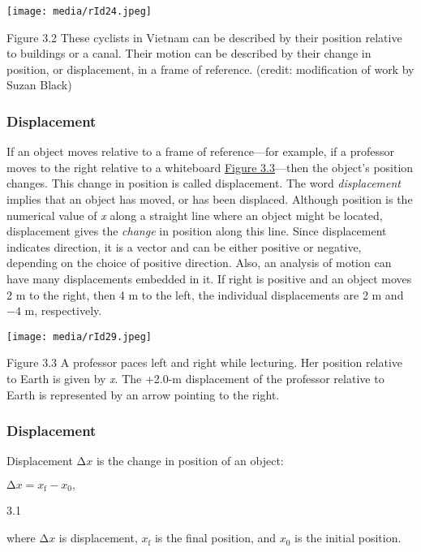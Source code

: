 \texttt{[image: media/rId24.jpeg]}

Figure 3.2 These cyclists in Vietnam can be described by their position
relative to buildings or a canal. Their motion can be described by their
change in position, or displacement, in a frame of reference. (credit:
modification of work by Suzan Black)

\hypertarget{displacement}{%
\subsubsection{Displacement}\label{displacement}}

If an object moves relative to a frame of reference---for example, if a
professor moves to the right relative to a whiteboard
\protect\hyperlink{CNX_UPhysics_03_01_Chalkboard}{Figure 3.3}---then the
object's position changes. This change in position is called
displacement. The word \emph{displacement} implies that an object has
moved, or has been displaced. Although position is the numerical value
of \emph{x} along a straight line where an object might be located,
displacement gives the \emph{change} in position along this line. Since
displacement indicates direction, it is a vector and can be either
positive or negative, depending on the choice of positive direction.
Also, an analysis of motion can have many displacements embedded in it.
If right is positive and an object moves 2 m to the right, then 4 m to
the left, the individual displacements are 2 m and \(- 4\) m,
respectively.

\texttt{[image: media/rId29.jpeg]}

Figure 3.3 A professor paces left and right while lecturing. Her
position relative to Earth is given by \emph{x}. The +2.0-m displacement
of the professor relative to Earth is represented by an arrow pointing
to the right.

\hypertarget{displacement-1}{%
\subsubsection{Displacement}\label{displacement-1}}

Displacement \(\mathrm{\Delta}x\) is the change in position of an
object:

\(\mathrm{\Delta}x = x_{\mathrm{f}} - x_{0},\)

3.1

where \(\mathrm{\Delta}x\) is displacement, \(x_{\mathrm{f}}\) is the
final position, and \(x_{0}\) is the initial position.

